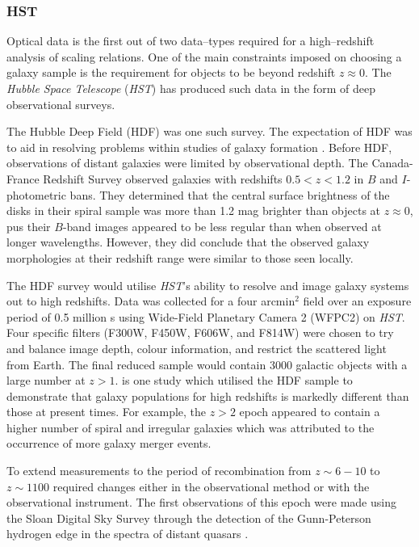 \documentclass[12pt, twocolumn, nofootinbib]{revtex4-1}    %
\begin{document}
\vspace{2ex} %
\subsubsection{HST}
\noindent
Optical data is the first out of two data--types required for a high--redshift analysis of scaling relations. One of the main constraints imposed on choosing a galaxy sample is the requirement for objects to be beyond redshift $z\approx0$. The \textit{Hubble Space Telescope} (\textit{HST}) has produced such data in the form of deep observational surveys.

The Hubble Deep Field (HDF) was one such survey. The expectation of HDF was to aid in resolving problems within studies of galaxy formation \citep{1996AJ....112.1335W}. Before HDF, observations of distant galaxies were limited by observational depth. The Canada-France Redshift Survey \citep{1995ApJ...455..108L} observed galaxies with redshifts $0.5<z<1.2$ in $B$ and $I$-photometric bans. They determined that the central surface brightness of the disks in their spiral sample was more than 1.2 mag brighter than objects at $z\approx0$, pus their $B$-band images appeared to be less regular than when observed at longer wavelengths. However, they did conclude that the observed galaxy morphologies at their redshift range were similar to those seen locally.

The HDF survey would utilise \textit{HST}'s ability to resolve and image galaxy systems out to high redshifts. Data was collected for a four arcmin$^2$ field over an exposure period of 0.5 million s using Wide-Field Planetary Camera 2 (WFPC2) on \textit{HST}. Four specific filters (F300W, F450W, F606W, and F814W) were chosen to try and balance image depth, colour information, and restrict the scattered light from Earth. The final reduced sample would contain 3000 galactic objects with a large number at $z>1$. \cite{1998ApJ...496L..93D} is one study which utilised the HDF sample to demonstrate that galaxy populations for high redshifts is markedly different than those at present times. For example, the $z>2$ epoch appeared to contain a higher number of spiral and irregular galaxies which was attributed to the occurrence of more galaxy merger events.

To extend measurements to the period of recombination from $z\sim6-10$ to $z\sim1100$ required changes either in the observational method or with the observational instrument. The first observations of this epoch were made using the Sloan Digital Sky Survey through the detection of the Gunn-Peterson hydrogen edge in the spectra of distant quasars \citep{2001AJ....122.2850B,2002AJ....123.1247F}.
\end{document}
